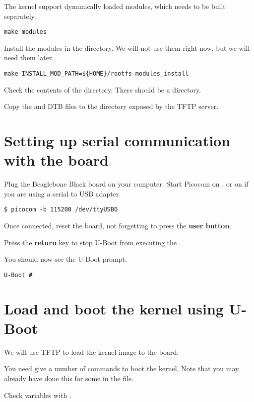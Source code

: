 The kernel support dynamically loaded modules, which needs to be built separately.

\begin{verbatim}
make modules
\end{verbatim}

Install the modules in the  directory.
We will not use them right now, but we will need them later.
 
\begin{verbatim}
make INSTALL_MOD_PATH=${HOME}/rootfs modules_install
\end{verbatim}

Check the contents of the  directory. There should be a  directory.

Copy the  and DTB files to the directory exposed by the TFTP server.

\section{Setting up serial communication with the board}

Plug the Beaglebone Black board on your computer. Start Picocom on
, or on  if you are using a serial
to USB adapter.

\begin{verbatim}
$ picocom -b 115200 /dev/ttyUSB0
\end{verbatim}


Once connected, reset the board, not forgetting to press the {\bf user button}.

Press the {\bf return} key to stop U-Boot from executing the .

You should now see the U-Boot prompt:

\begin{verbatim}
U-Boot #
\end{verbatim}

\clearpage
\section{Load and boot the kernel using U-Boot}

We will use TFTP to load the kernel image to the \devboard board:

You need give a number of commands to boot the kernel, 
Note that you may already have done this for some in the  file.

Check variables with .

